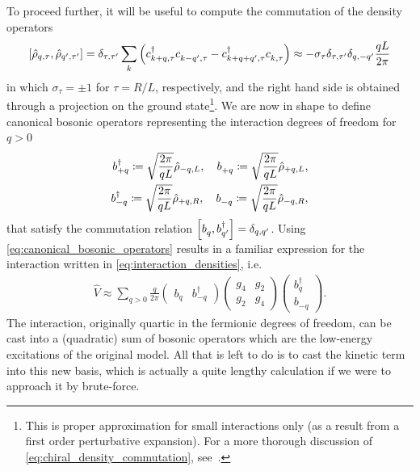 To proceed further, it will be useful to compute the commutation of the density operators
\begin{align}
    \commutator{\hat\rho_{q,\tau},\hat\rho_{q',\tau'}}
    =
    \delta_{\tau,\tau'}\sum_k\brlr{c^\dag_{k+q,\tau}c^\pdag_{k-q',\tau}-c^\dag_{k+q+q',\tau}c^\pdag_{k,\tau}}
    \approx
    -\sigma_\tau\delta_{\tau,\tau'}\delta_{q,-q'}\frac{qL}{2\pi}
    \label{eq:chiral_density_commutation}
\end{align}
in which $\sigma_\tau=\pm1$ for $\tau=R/L$, respectively, and the right hand side is obtained through a projection on the ground state\footnote{This is proper approximation for small interactions only (as a result from a first order perturbative expansion). For a more thorough discussion of \cref{eq:chiral_density_commutation}, see~\cite{Giamarchi2003}.}.
We are now in shape to define canonical bosonic operators representing the interaction degrees of freedom for $q>0$
\begin{align}
    b^\dag_{+q} \coloneqq \sqrt\frac{2\pi}{qL}\hat\rho_{-q,L},
    \quad
    b^\pdag_{+q} \coloneqq \sqrt\frac{2\pi}{qL}\hat\rho_{+q,L},
    \\
    b^\dag_{-q} \coloneqq \sqrt\frac{2\pi}{qL}\hat\rho_{+q,R},
    \quad
    b^\pdag_{-q} \coloneqq \sqrt\frac{2\pi}{qL}\hat\rho_{-q,R},
    \label{eq:canonical_bosonic_operators}
\end{align}
that satisfy the commutation relation $\commutator{b_q^\pdag,b_{q'}^\dag} = \delta_{q,q'}$.
Using \cref{eq:canonical_bosonic_operators} results in a familiar expression for the interaction written in \cref{eq:interaction_densities}, i.e.
\begin{align}
    \hat V \approx\sum_{q>0}\frac{q}{2\pi}
    \begin{pmatrix}
        b_q & b^\dag_{-q}
    \end{pmatrix}
    \begin{pmatrix}
        g_4 & g_2 \\
        g_2 & g_4
    \end{pmatrix}
    \begin{pmatrix}
        b^\dag_q \\ b_{-q}
    \end{pmatrix}
    .
    \label{eq:quadratic_interactions}
\end{align}
The interaction, originally quartic in the fermionic degrees of freedom, can be cast into a (quadratic) sum of bosonic operators which are the low-energy excitations of the original model.
All that is left to do is to cast the kinetic term into this new basis, which is actually a quite lengthy calculation if we were to approach it by brute-force.
